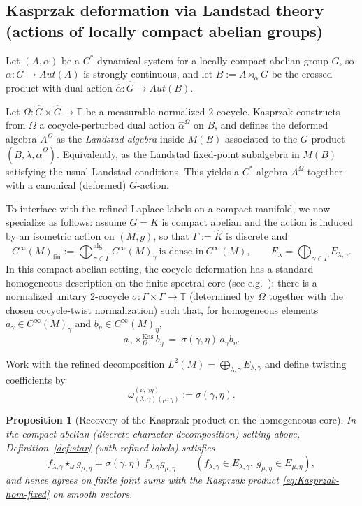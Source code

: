 \documentclass[11pt]{amsart}
\theoremstyle{plain}
\newtheorem{proposition}[theorem]{Proposition}
\theoremstyle{definition}
\theoremstyle{remark}
\newcommand{\bbT}{\mathbb{T}}
\newcommand{\Aut}{Aut}
\begin{document}
\subsection{Kasprzak deformation via Landstad theory (actions of locally compact abelian groups)}\label{subsec:Kasprzak}

Let $(A,\alpha)$ be a $C^*$-dynamical system for a locally compact abelian group $G$, so $\alpha:G\to\Aut(A)$ is strongly continuous,
and let $B:=A\rtimes_\alpha G$ be the crossed product with dual action $\widehat\alpha:\widehat G\to\Aut(B)$.

Let $\Omega:\widehat G\times\widehat G\to\bbT$ be a measurable normalized $2$-cocycle.
Kasprzak \cite{Kasprzak} constructs from $\Omega$ a cocycle-perturbed dual action $\widehat\alpha^\Omega$ on $B$,
and defines the deformed algebra $A^\Omega$ as the \emph{Landstad algebra} inside $M(B)$ associated to the $G$-product
$(B,\lambda,\widehat\alpha^\Omega)$. Equivalently, as the Landstad fixed-point subalgebra in $M(B)$ satisfying the usual Landstad conditions.
This yields a $C^*$-algebra $A^\Omega$ together with a canonical (deformed) $G$-action.

To interface with the refined Laplace labels on a compact manifold, we now specialize as follows:
assume $G=K$ is compact abelian and the action is induced by an isometric action on $(M,g)$, so that $\Gamma:=\widehat K$ is discrete and
\[
C^\infty(M)_{\mathrm{fin}}:=\bigoplus_{\gamma\in\Gamma}^{\mathrm{alg}}C^\infty(M)_\gamma\ \text{is dense in}\ C^\infty(M),\qquad E_\lambda=\bigoplus_{\gamma\in\Gamma}E_{\lambda,\gamma}.
\]
In this compact abelian setting, the cocycle deformation has a standard homogeneous description on the finite spectral core (see e.g.\ \cite{Kasprzak}):
there is a normalized unitary $2$-cocycle $\sigma:\Gamma\times\Gamma\to\bbT$ (determined by $\Omega$ together with the chosen cocycle-twist normalization)
such that, for homogeneous elements $a_\gamma\in C^\infty(M)_\gamma$ and $b_\eta\in C^\infty(M)_\eta$,
\begin{equation}\label{eq:Kasprzak-hom-fixed}
a_\gamma\times^\mathrm{Kas}_\Omega b_\eta \ =\ \sigma(\gamma,\eta)\,a_\gamma b_\eta.
\end{equation}

Work with the refined decomposition $L^2(M)=\bigoplus_{\lambda,\gamma}E_{\lambda,\gamma}$ and define twisting coefficients by
\[
\omega^{(\nu,\gamma\eta)}_{(\lambda,\gamma)(\mu,\eta)}:=\sigma(\gamma,\eta).
\]

\begin{proposition}[Recovery of the Kasprzak product on the homogeneous core]\label{prop:recover-Kasprzak-fixed}
In the compact abelian (discrete character-decomposition) setting above, Definition~\ref{def:star} (with refined labels) satisfies
\[
f_{\lambda,\gamma}\star_\omega g_{\mu,\eta}=\sigma(\gamma,\eta)\,f_{\lambda,\gamma}g_{\mu,\eta}
\qquad (f_{\lambda,\gamma}\in E_{\lambda,\gamma},\ g_{\mu,\eta}\in E_{\mu,\eta}),
\]
and hence agrees on finite joint sums with the Kasprzak product \eqref{eq:Kasprzak-hom-fixed} on smooth vectors.
\end{proposition}
\end{document}
